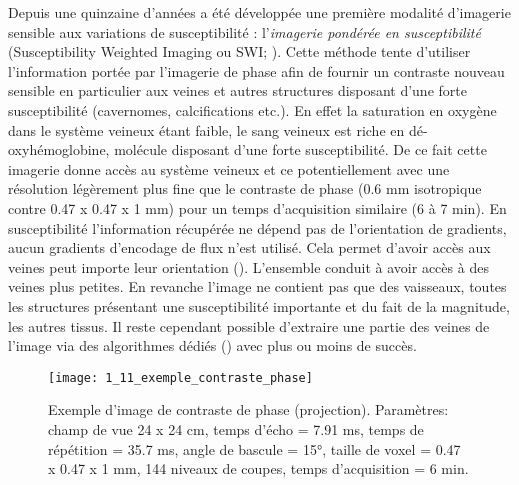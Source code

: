 Depuis une quinzaine d'années a été développée une première modalité d’imagerie sensible aux variations de susceptibilité : l’{\em imagerie pondérée en susceptibilité} (Susceptibility Weighted Imaging ou SWI; \cite{Reichenbach2001}). Cette méthode tente d’utiliser l’information portée par l’imagerie de phase afin de fournir un contraste nouveau sensible en particulier aux veines et autres structures disposant d’une forte susceptibilité (cavernomes, calcifications etc.). En effet la saturation en oxygène dans le système veineux étant faible, le sang veineux est riche en dé-oxyhémoglobine, molécule disposant d’une forte susceptibilité. De ce fait cette imagerie donne accès au système veineux et ce potentiellement avec une résolution légèrement plus fine que le contraste de phase (0.6 mm isotropique contre 0.47 x 0.47 x 1 mm) pour un temps d'acquisition similaire (6 à 7 min). En susceptibilité  l'information récupérée ne dépend pas de l'orientation de gradients, aucun gradients d'encodage de flux n'est utilisé. Cela permet d'avoir accès aux veines peut importe leur orientation (\cite{Fan2014}). L'ensemble conduit à avoir accès à des veines plus petites. En revanche l’image ne contient pas que des vaisseaux, toutes les structures présentant une susceptibilité importante et du fait de la magnitude, les autres tissus. Il reste cependant possible d’extraire une partie des veines de l’image via des algorithmes dédiés (\cite{Manniesing2006}) avec plus ou moins de succès.\\
\begin{figure}[!t]
\centering
\texttt{[image: 1\_11\_exemple\_contraste\_phase]}
\caption{Exemple d'image de contraste de phase (projection). Paramètres: champ de vue 24 x 24 cm, temps d’écho = 7.91 ms, temps de répétition = 35.7 ms, angle de bascule = 15°, taille de voxel = 0.47 x 0.47 x 1 mm, 144 niveaux de coupes, temps d'acquisition = 6 min.}
\label{fig:1_11_exemple_contraste_phase}	
\end{figure}

